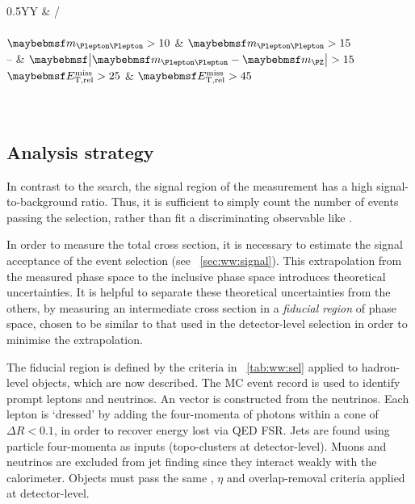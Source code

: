 \begin{description}
	\begin{table}[b]
		\begin{tabularx}{0.5\textwidth}{YY}
			\toprule
			\emch & \eech/\mmch \\
			\midrule
			 \\
			$\mll > 10$    & $\mll > 15$ \\
			--             & $\mods{\mll - \mZ} > 15$ \\
			$\calometrel > 25$ & $\calometrel > 45$ \\
			 \\
			 \\
			\bottomrule
		\end{tabularx}
		\caption{Summary of \WW event selection. Cuts are given in \GeV. The relevant observables are described in \Chapter~\ref{chap:selection}.}
		\label{tab:ww:sel}
	\end{table}

\end{description}



\subsection{Analysis strategy}
\label{sec:ww:strategy}

In contrast to the \HWW search, the signal region of the \WW measurement has a high 
signal-to-background ratio. Thus, it is sufficient to simply count the number of events 
passing the selection, rather than fit a discriminating observable like \mt.

In order to measure the total \WW cross section, it is necessary to estimate the signal 
acceptance of the event selection (see \Section~\ref{sec:ww:signal}). This extrapolation 
from the measured phase space to the inclusive phase space introduces theoretical 
uncertainties. It is helpful to separate these theoretical uncertainties from the others, 
by measuring an intermediate cross section in a \textit{fiducial region} of phase space, 
chosen to be similar to that used in the detector-level selection in order to minimise 
the extrapolation.

The fiducial region is defined by the criteria in \Table~\ref{tab:ww:sel} applied to 
hadron-level objects, which are now described. The MC event record is used to identify 
prompt leptons and neutrinos. An \truthmetvec vector is constructed 
from the neutrinos. Each lepton is `dressed' by adding the four-momenta of photons within a 
cone of $\Delta R < 0.1$, in order to recover energy lost via QED FSR. Jets are found 
using particle four-momenta as inputs (\cf topo-clusters at detector-level). Muons and 
neutrinos are excluded from jet finding since they interact weakly with the calorimeter. 
Objects must pass the same \pt, $\eta$ and overlap-removal criteria applied at 
detector-level.

